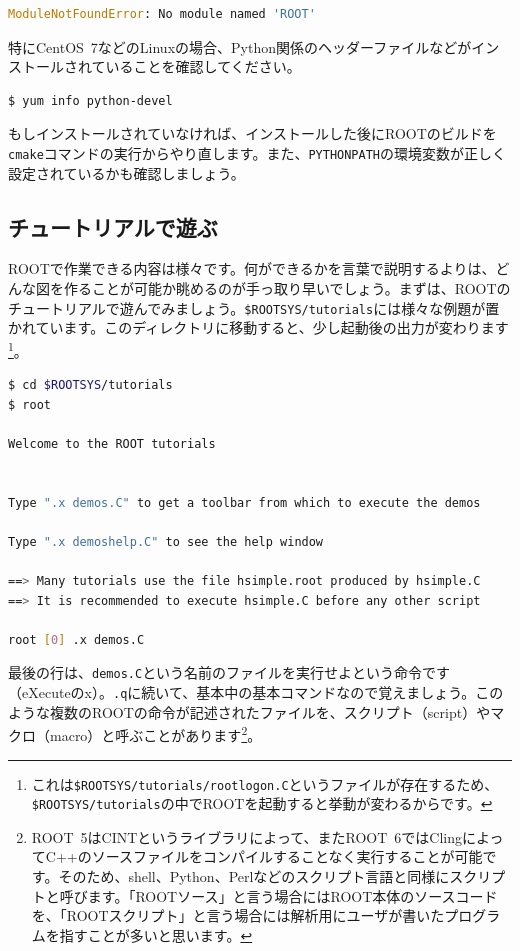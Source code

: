 {\begin{lstlisting}[language=python]
ModuleNotFoundError: No module named 'ROOT'
\end{lstlisting}
特にCentOS~7などのLinuxの場合、Python関係のヘッダーファイルなどがインストールされていることを確認してください。
\begin{lstlisting}[language=bash]
$ yum info python-devel
\end{lstlisting}
もしインストールされていなければ、インストールした後にROOTのビルドを\texttt{cmake}コマンドの実行からやり直します。また、\texttt{PYTHONPATH}の環境変数が正しく設定されているかも確認しましょう。

\subsection{チュートリアルで遊ぶ}
\label{subsec:tutorial}
ROOTで作業できる内容は様々です。何ができるかを言葉で説明するよりは、どんな図を作ることが可能か眺めるのが手っ取り早いでしょう。まずは、ROOTのチュートリアルで遊んでみましょう。\texttt{\$ROOTSYS/tutorials}には様々な例題が置かれています。このディレクトリに移動すると、少し起動後の出力が変わります\footnote{これは\texttt{\$ROOTSYS/tutorials/rootlogon.C}というファイルが存在するため、\texttt{\$ROOTSYS/tutorials}の中でROOTを起動すると挙動が変わるからです。}。
\begin{lstlisting}[language=bash]
$ cd $ROOTSYS/tutorials
$ root

Welcome to the ROOT tutorials


Type ".x demos.C" to get a toolbar from which to execute the demos

Type ".x demoshelp.C" to see the help window

==> Many tutorials use the file hsimple.root produced by hsimple.C
==> It is recommended to execute hsimple.C before any other script

root [0] .x demos.C
\end{lstlisting}
最後の行は、\texttt{demos.C}という名前のファイルを実行せよという命令です（eXecuteのx）。\texttt{.q}に続いて、基本中の基本コマンドなので覚えましょう。このような複数のROOTの命令が記述されたファイルを、スクリプト（script）やマクロ（macro）と呼ぶことがあります\footnote{ROOT~5はCINTというライブラリによって、またROOT~6ではClingによってC++のソースファイルをコンパイルすることなく実行することが可能です。そのため、shell、Python、Perlなどのスクリプト言語と同様にスクリプトと呼びます。「ROOTソース」と言う場合にはROOT本体のソースコードを、「ROOTスクリプト」と言う場合には解析用にユーザが書いたプログラムを指すことが多いと思います。}。

}
